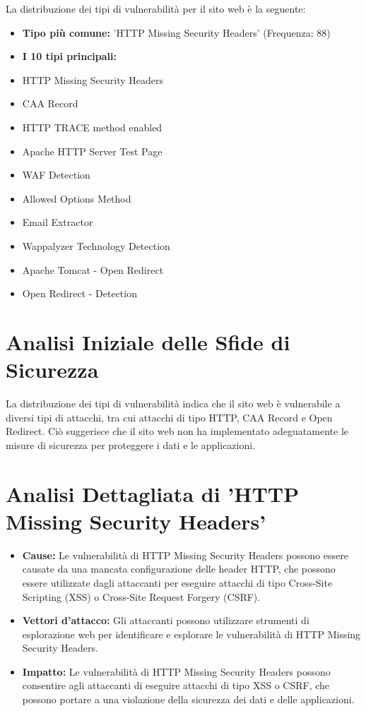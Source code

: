 La distribuzione dei tipi di vulnerabilità per il sito web è la seguente:
\begin{itemize}
\item \textbf{Tipo più comune:} 'HTTP Missing Security Headers' (Frequenza: 88)
\item \textbf{I 10 tipi principali:}
\item HTTP Missing Security Headers
\item CAA Record
\item HTTP TRACE method enabled
\item Apache HTTP Server Test Page
\item WAF Detection
\item Allowed Options Method
\item Email Extractor
\item Wappalyzer Technology Detection
\item Apache Tomcat - Open Redirect
\item Open Redirect - Detection
\end{itemize}
\section{Analisi Iniziale delle Sfide di Sicurezza}

La distribuzione dei tipi di vulnerabilità indica che il sito web è vulnerabile a diversi tipi di attacchi, tra cui attacchi di tipo HTTP, CAA Record e Open Redirect. Ciò suggerisce che il sito web non ha implementato adeguatamente le misure di sicurezza per proteggere i dati e le applicazioni.

\section{Analisi Dettagliata di 'HTTP Missing Security Headers'}
\begin{itemize}
\item \textbf{Cause:} Le vulnerabilità di HTTP Missing Security Headers possono essere causate da una mancata configurazione delle header HTTP, che possono essere utilizzate dagli attaccanti per eseguire attacchi di tipo Cross-Site Scripting (XSS) o Cross-Site Request Forgery (CSRF).
\item \textbf{Vettori d'attacco:} Gli attaccanti possono utilizzare strumenti di esplorazione web per identificare e esplorare le vulnerabilità di HTTP Missing Security Headers.
\item \textbf{Impatto:} Le vulnerabilità di HTTP Missing Security Headers possono consentire agli attaccanti di eseguire attacchi di tipo XSS o CSRF, che possono portare a una violazione della sicurezza dei dati e delle applicazioni.
\end{itemize}

